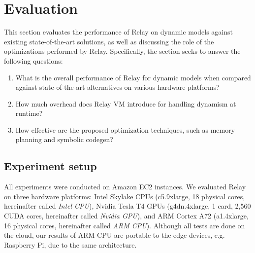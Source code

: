 \section{Evaluation}
\label{sec:eval}

This section evaluates the performance of Relay on dynamic models against existing state-of-the-art solutions, as well as discussing the role of the optimizations performed by Relay. Specifically, the section seeks to answer the following questions:
\begin{enumerate}
    \item What is the overall performance of Relay for dynamic models when compared against state-of-the-art alternatives on various hardware platforms?
    \item How much overhead does Relay VM introduce for handling dynamism at runtime?
    \item How effective are the proposed optimization techniques, such as memory planning and symbolic codegen?
\end{enumerate}

\subsection{Experiment setup}
\label{sec:eval:setup}

All experiments were conducted on Amazon EC2 instances. We evaluated Relay on three hardware platforms: Intel Skylake CPUs (c5.9xlarge, 18 physical cores, hereinafter called {\em Intel CPU}), Nvidia Tesla T4 GPUs (g4dn.4xlarge, 1 card, 2,560 CUDA cores, hereinafter called {\em Nvidia GPU}), and ARM Cortex A72 (a1.4xlarge, 16 physical cores, hereinafter called {\em ARM CPU}). Although all tests are done on the cloud, our results of ARM CPU are portable to the edge devices, e.g. Raspberry Pi, due to the same architecture. %

